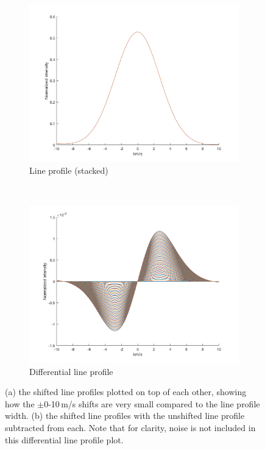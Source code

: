 \begin{figure}[tbp]
    \begin{subfigure}[b]{0.49\textwidth}
        \includegraphics[width=\textwidth]{./Figures/Methods/1-Line_Profile.png}
        \caption{Line profile (stacked)}
        \label{fig:line_profiles}
    \end{subfigure}
	~
    \begin{subfigure}[b]{0.49\textwidth}
        \includegraphics[width=\textwidth]{./Figures/Methods/1-Differential_line_Profile.png}
        \caption{Differential line profile}
        \label{fig:differential_line_profiles}
    \end{subfigure}	
    
    \caption[100 shifted HARPS-like line profiles]{(a) the shifted line profiles plotted on top of each other, showing how the $\pm$0-10\,m/s shifts are
    very small compared to the line profile width. (b) the shifted line profiles with the unshifted line profile subtracted from each. 
    Note that for clarity, noise is not included in  this differential line profile plot.}
\label{fig:line_profiles12}
\end{figure}	
	
